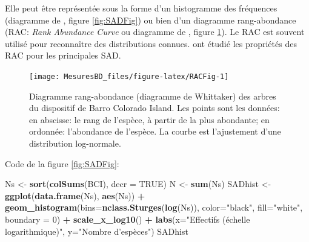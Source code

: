 \documentclass[
  11pt,
  french,
  a4paper,
  extrafontsizes,onecolumn,openright
  ]{memoir}
\newenvironment{Shaded}{\begin{snugshade}}{\end{snugshade}}
\newcommand{\DataTypeTok}[1]{\textcolor[rgb]{0.13,0.29,0.53}{#1}}
\newcommand{\DecValTok}[1]{\textcolor[rgb]{0.00,0.00,0.81}{#1}}
\newcommand{\KeywordTok}[1]{\textcolor[rgb]{0.13,0.29,0.53}{\textbf{#1}}}
\newcommand{\NormalTok}[1]{#1}
\newcommand{\OperatorTok}[1]{\textcolor[rgb]{0.81,0.36,0.00}{\textbf{#1}}}
\newcommand{\OtherTok}[1]{\textcolor[rgb]{0.56,0.35,0.01}{#1}}
\newcommand{\StringTok}[1]{\textcolor[rgb]{0.31,0.60,0.02}{#1}}
\begin{document}
\normalsize

Elle peut être représentée sous la forme d'un histogramme des fréquences (diagramme de \textcite{Preston1948}, figure \ref{fig:SADFig}) ou bien d'un diagramme rang-abondance (RAC: \emph{Rank Abundance Curve} ou diagramme de \textcite{Whittaker1965}, figure \ref{fig:RACFig}).
Le RAC est souvent utilisé pour reconnaître des distributions connues.
\textcite{Izsak2012} ont étudié les propriétés des RAC pour les principales SAD.



\scriptsize

\begin{figure}

{\centering \texttt{[image: MesuresBD\_files/figure-latex/RACFig-1]} 

}

\caption{Diagramme rang-abondance (diagramme de Whittaker) des arbres du dispositif de Barro Colorado Island. Les points sont les données: en abscisse: le rang de l'espèce, à partir de la plus abondante; en ordonnée: l'abondance de l'espèce. La courbe est l'ajustement d'une distribution log-normale.}\label{fig:RACFig}
\end{figure}

\normalsize

Code de la figure \ref{fig:SADFig}:

\scriptsize

\begin{Shaded}
\begin{Highlighting}[]
\NormalTok{Ns <-}\StringTok{ }\KeywordTok{sort}\NormalTok{(}\KeywordTok{colSums}\NormalTok{(BCI), }\DataTypeTok{decr =} \OtherTok{TRUE}\NormalTok{)}
\NormalTok{N <-}\StringTok{ }\KeywordTok{sum}\NormalTok{(Ns)}
\NormalTok{SADhist <-}\StringTok{ }\KeywordTok{ggplot}\NormalTok{(}\KeywordTok{data.frame}\NormalTok{(Ns), }\KeywordTok{aes}\NormalTok{(Ns)) }\OperatorTok{+}\StringTok{ }
\StringTok{  }\KeywordTok{geom_histogram}\NormalTok{(}\DataTypeTok{bins=}\KeywordTok{nclass.Sturges}\NormalTok{(}\KeywordTok{log}\NormalTok{(Ns)), }
       \DataTypeTok{color=}\StringTok{"black"}\NormalTok{, }\DataTypeTok{fill=}\StringTok{"white"}\NormalTok{, }\DataTypeTok{boundary =} \DecValTok{0}\NormalTok{) }\OperatorTok{+}
\StringTok{  }\KeywordTok{scale_x_log10}\NormalTok{() }\OperatorTok{+}
\StringTok{  }\KeywordTok{labs}\NormalTok{(}\DataTypeTok{x=}\StringTok{"Effectifs (échelle logarithmique)"}\NormalTok{, }
       \DataTypeTok{y=}\StringTok{"Nombre d'espèces"}\NormalTok{)}
\NormalTok{SADhist}
\end{Highlighting}
\end{Shaded}
\end{document}

